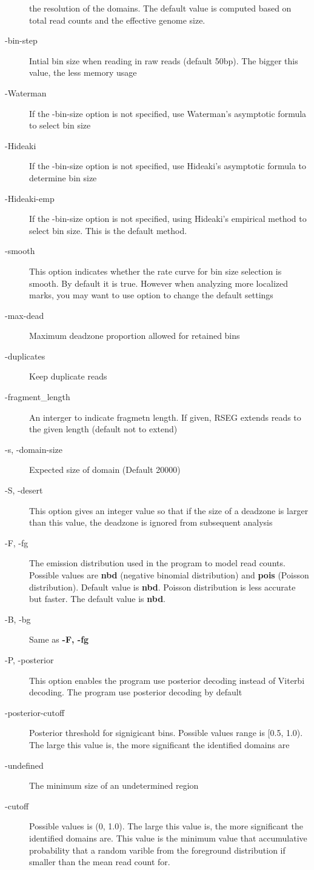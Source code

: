 \documentclass[11pt]{report}
\begin{document}
\begin{description}
  the resolution of the domains. The default value is computed based
  on total read counts and the effective genome size.
\item[-bin-step] Intial bin size when reading in raw reads
  (default 50bp). The bigger this value, the less memory usage
\item[-Waterman] If the -bin-size option is not specified, use
  Waterman's asymptotic formula to select bin size
\item[-Hideaki] If the -bin-size option is not specified, use
  Hideaki's asymptotic formula to determine bin size
\item[-Hideaki-emp] If the -bin-size option is not specified, using
  Hideaki's empirical method to select bin size. This is the default
  method.
\item[-smooth] This option indicates whether the rate curve for bin
  size selection is smooth. By default it is true. However when
  analyzing more localized marks, you may want to use option to change
  the default settings
\item[-max-dead] Maximum deadzone proportion allowed for
  retained bins
\item[-duplicates] Keep duplicate reads
\item[-fragment\_length] An interger to indicate fragmetn length. If given, RSEG
  extends reads to the given length (default not to extend)
\item[-s, -domain-size] Expected size of domain (Default 20000) 
\item[-S, -desert] This option gives an integer value so that if
  the size of a deadzone is larger than this value, the deadzone is
  ignored from subsequent analysis
\item[-F, -fg] The emission distribution used in the program to model
  read counts. Possible values are \textbf{nbd} (negative binomial
  distribution) and \textbf{pois} (Poisson distribution). Default
  value is \textbf{nbd}. Poisson distribution is less accurate but
  faster.  The default value is \textbf{nbd}.
\item[-B, -bg] Same as \textbf{-F, -fg} 
\item[-P, -posterior] This option enables the program use posterior
  decoding instead of Viterbi decoding. The program use posterior
  decoding by default
\item[-posterior-cutoff] Posterior threshold for signigicant
  bins. Possible values range is [0.5, 1.0). The large this value is,
  the more significant the identified domains are
\item[-undefined] The minimum size of an undetermined region
\item[-cutoff] Possible values is (0, 1.0). The large this value
  is, the more significant the identified domains are. This value is
  the minimum value that accumulative probability that a random
  varible from the foreground distribution if smaller than the mean
  read count for.
\end{description}
\end{document}
